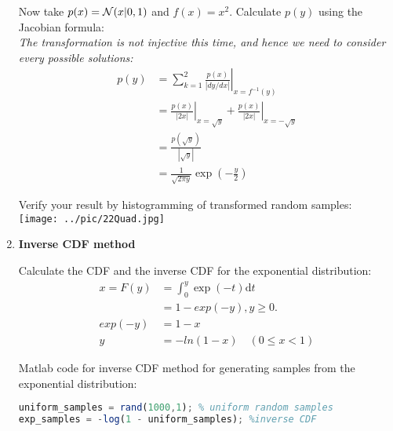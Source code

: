 \documentclass[12pt]{article}
\begin{document}
\begin{enumerate}
Now take $p(x)={\cal N}(x|0,1)$ and $f(x)=x^2$. Calculate $p(y)$ using the Jacobian formula:\\
{\em
The transformation is not injective this time, and hence we need to consider every possible solutions:\\
\begin{equation*}
\begin{split}
  p(y) & = \sum_{k=1}^2{\left.\frac{p(x)}{|dy/dx|}\right|_{x=f^{-1}(y)}} \\
       & = \left.\frac{p(x)}{|2x|}\right|_{x=\sqrt{y}}+\left.\frac{p(x)}{|2x|}\right|_{x=-\sqrt{y}} \\
       & = \frac{p(\sqrt{y})}{|\sqrt{y}|}\\
       & = \frac{1}{\sqrt{2\pi y}}\exp{(-\frac{y}{2})}
\end{split}
\end{equation*}
}
\vspace{5in}




Verify your result by histogramming of transformed random samples:
\\
\texttt{[image: ../pic/22Quad.jpg]}

\vspace{1in}


\item{\bf Inverse CDF method} 



Calculate the CDF and the inverse CDF for the exponential distribution: 
\\
{\em
\begin{equation*}
\begin{split}
  x = F(y) & = \int_0^y \mathrm \exp{(-t)} \mathrm dt \\
           & = 1 - exp(-y) , y\geq0. \\
   exp(-y) & = 1-x \\
   y & = -ln(1-x) \quad (0 \leq x < 1)        
\end{split}    
\end{equation*}   
}
\vspace{3in}



Matlab code for inverse CDF method for generating samples from the exponential distribution:
\\

{\em
\begin{lstlisting}[language=Octave]
uniform_samples = rand(1000,1); % uniform random samples
exp_samples = -log(1 - uniform_samples); %inverse CDF
\end{lstlisting}
}


\end{enumerate}
\end{document}
